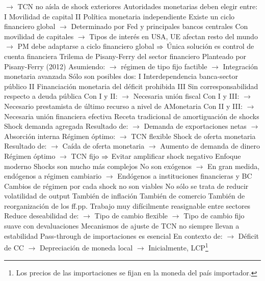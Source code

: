 \documentclass{nuevotema}
\begin{document}
\begin{esquemal}
				\4[] $\to$ TCN no aísla de shock exteriores
				\4[] Autoridades monetarias deben elegir entre:
				\4[] \textsc{I} Movilidad de capital
				\4[] \textsc{II} Política monetaria independiente
				\4[] Existe un ciclo financiero global
				\4[] $\to$ Determinado por Fed y principales bancos centrales
				\4[] Con movilidad de capitales
				\4[] $\to$ Tipos de interés en USA, UE afectan resto del mundo
				\4[] $\to$ PM debe adaptarse a ciclo financiero global
				\4[] $\Rightarrow$ Única solución es control de cuenta financiera
				\4 Trilema de Pisany-Ferry del sector financiero
				\4[] Planteado por Pisany-Ferry (2012)
				\4[] Asumiendo:
				\4[] $\to$ régimen de tipo fijo factible
				\4[] $\to$ Integración monetaria avanzada
				\4[] Sólo son posibles dos:
				\4[] \textsc{I} Interdependencia banca-sector público
				\4[] \textsc{II} Financiación monetaria del déficit prohibida
				\4[] \textsc{III} Sin corresponsabilidad respecto a deuda pública
				\4[] Con I y II:
				\4[] $\to$ Necesaria unión fiscal
				\4[] Con I y III:
				\4[] $\to$  Necesario prestamista de último recurso a nivel de AMonetaria
				\4[] Con II y III:
				\4[] $\to$  Necesaria unión financiera efectiva
			\3 Receta tradicional de amortiguación de shocks
				\4 Shock demanda agregada
				\4[] Resultado de:
				\4[] $\to$ Demanda de exportaciones netas
				\4[] $\to$ Absorción interna
				\4[] Régimen óptimo:
				\4[] $\to$ TCN flexible
				\4 Shock de oferta monetaria
				\4[] Resultado de:
				\4[] $\to$ Caída de oferta monetaria
				\4[] $\to$ Aumento de demanda de dinero
				\4[] Régimen óptimo
				\4[] $\to$ TCN fijo
				\4[] $\Rightarrow$ Evitar amplificar shock negativo
			\3 Enfoque moderno
				\4 Shocks son mucho más complejos
				\4[] No son exógenos
				\4[] $\to$ En gran medida, endógenos a régimen cambiario
				\4[] $\to$ Endógenos a instituciones financieras y BC
				\4 Cambios de régimen por cada shock no son viables
				\4 No sólo se trata de reducir volatilidad de output
				\4[] También de inflación
				\4[] También de comercio
				\4[] También de reorganización de los ff.pp.
				\4 Trabajo muy difícilmente reasignable entre sectores
				\4[] Reduce deseabilidad de:
				\4[] $\to$ Tipo de cambio flexible
				\4[] $\to$ Tipo de cambio fijo suave con devaluaciones
				\4 Mecanismos de ajuste de TCN no siempre llevan a estabilidad
				\4[] Pass-through de importaciones es esencial
				\4[] En contexto de:
				\4[] $\to$ Déficit de CC
				\4[] $\to$ Depreciación de moneda local
				\4[] $\to$ Inicialmente, LCP\footnote{Los precios de las importaciones se fijan en la moneda del país importador.}

\end{esquemal}
\end{document}
